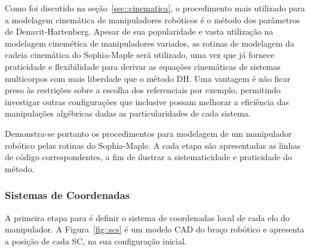 Como foi discutido na seção~\ref{sec::cinematica}, o procedimento mais utilizado
para a modelagem cinemática de manipuladores robóticos é o método dos parâmetros
de Denavit-Hartenberg. Apesar de sua popularidade e vasta utilização na
modelagem cinemética de manipuladores variados, as rotinas de modelagem da
cadeia cinemática do Sophia-Maple será utilizado, uma vez que já fornece
praticidade e flexibilidade para derivar as equações cinemáticas de sistemas
multicorpos com mais liberdade que o método DH. Uma vantagem é não ficar
preso às restrições sobre a escolha dos referenciais por exemplo, permitindo
investigar outras configurações que inclusive possam melhorar a eficiência das
manipulações algébricas dadas as particularidades de cada sistema.

Demonstra-se portanto os procedimentos para modelagem de um manipulador robótico
pelas rotinas do Sophia-Maple. A cada etapa são apresentadas as linhas de código
correspondentes, a fim de ilustrar a sistematicidade e praticidade do método.

\subsubsection{Sistemas de Coordenadas}

A primeira etapa para é definir o sistema de coordenadas local de cada elo do
manipulador. A Figura~\ref{fig::scs} é um modelo CAD do braço robótico e
apresenta a posição de cada SC, na sua configuração inicial.

